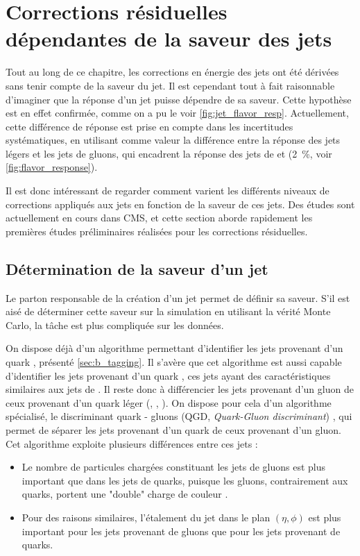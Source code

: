 \section{Corrections résiduelles dépendantes de la saveur des jets}

Tout au long de ce chapitre, les corrections en énergie des jets ont été dérivées sans tenir compte de la saveur du jet. Il est cependant tout à fait raisonnable d'imaginer que la réponse d'un jet puisse dépendre de sa saveur. Cette hypothèse est en effet confirmée, comme on a pu le voir \cref{fig:jet_flavor_resp}. Actuellement, cette différence de réponse est prise en compte dans les incertitudes systématiques, en utilisant comme valeur la différence entre la réponse des jets légers et les jets de gluons, qui encadrent la réponse des jets de \Pcharm et \Pbottom (\tilde\SI{2}{\percent}, voir \cref{fig:flavor_response}).

Il est donc intéressant de regarder comment varient les différents niveaux de corrections appliqués aux jets en fonction de la saveur de ces jets. Des études sont actuellement en cours dans CMS, et cette section aborde rapidement les premières études préliminaires réalisées pour les corrections résiduelles.

\subsection{Détermination de la saveur d'un jet}

Le parton responsable de la création d'un jet permet de définir sa saveur. S'il est aisé de déterminer cette saveur sur la simulation en utilisant la vérité Monte Carlo, la tâche est plus compliquée sur les données.

On dispose déjà d'un algorithme permettant d'identifier les jets provenant d'un quark \Pbottom, présenté \cref{sec:b_tagging}. Il s'avère que cet algorithme est aussi capable d'identifier les jets provenant d'un quark \Pcharm, ces jets ayant des caractéristiques similaires aux jets de \Pbottom. Il reste donc à différencier les jets provenant d'un gluon de ceux provenant d'un quark léger (\Pup, \Pdown, \Pstrange). On dispose pour cela d'un algorithme spécialisé, le discriminant quark - gluons (QGD, \emph{Quark-Gluon discriminant}) \citep{CMS-PAS-JME-13-002}, qui permet de séparer les jets provenant d'un quark de ceux provenant d'un gluon. Cet algorithme exploite plusieurs différences entre ces jets :
\begin{itemize}
  \item Le nombre de particules chargées constituant les jets de gluons est plus important que dans les jets de quarks, puisque les gluons, contrairement aux quarks, portent une "double" charge de couleur \citep{Dremin:2000wt}.
  \item Pour des raisons similaires, l'étalement du jet dans le plan $(\eta, \phi)$ est plus important pour les jets provenant de gluons que pour les jets provenant de quarks.
\end{itemize}

